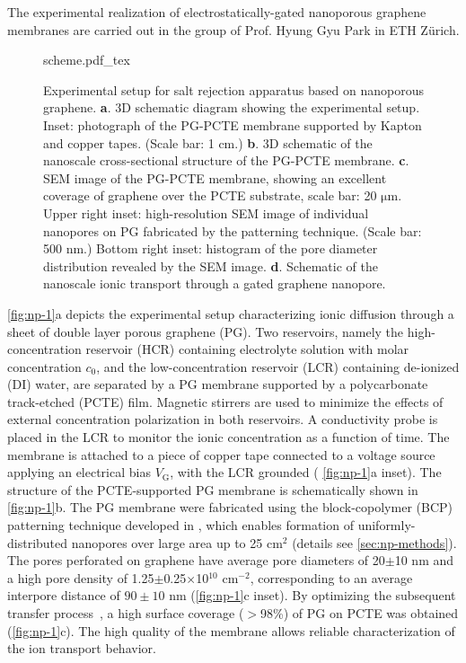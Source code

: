 The experimental realization of electrostatically-gated nanoporous
graphene membranes are carried out in the group of Prof. Hyung Gyu
Park in ETH Zürich.

\begin{figure}[!htbp]
  \centering
  {scheme.pdf_tex}
  \caption{Experimental setup for salt rejection apparatus based on
    nanoporous graphene.  \textbf{a}. 3D schematic diagram showing the
    experimental setup. Inset: photograph of the PG-PCTE membrane
    supported by Kapton and copper tapes. (Scale bar: 1 cm.)
    \textbf{b}. 3D schematic of the nanoscale cross-sectional
    structure of the PG-PCTE membrane. \textbf{c}. SEM image of the
    PG-PCTE membrane, showing an excellent coverage of graphene over
    the PCTE substrate, scale bar: 20 $\mathrm{\mu}$m.  Upper right
    inset: high-resolution SEM image of individual nanopores on PG
    fabricated by the patterning technique. (Scale bar: 500 nm.)
    Bottom right inset: histogram of the pore diameter distribution
    revealed by the SEM image. \textbf{d}. Schematic of the nanoscale
    ionic transport through a gated graphene nanopore.}
  \label{fig:np-1}
\end{figure}

%
 \autoref{fig:np-1}a depicts the experimental setup characterizing
ionic diffusion through a sheet of double layer porous graphene
(PG).
%
Two reservoirs, namely the high-concentration reservoir (HCR)
containing electrolyte solution with molar concentration $c_0$, and
the low-concentration reservoir (LCR) containing de-ionized (DI)
water, are separated by a PG membrane supported by a polycarbonate
track-etched (PCTE) film.
%
Magnetic stirrers are used to minimize the effects of external
concentration polarization in both reservoirs.
%
A conductivity
probe is placed in the LCR to monitor the ionic concentration as a
function of time. The membrane is attached to a piece of copper tape
connected to a voltage source applying an electrical bias
$V_{\mathrm{G}}$, with the LCR grounded ( \autoref{fig:np-1}a
inset).
%
The structure of the PCTE-supported PG membrane is schematically shown
in \autoref{fig:np-1}b. The PG membrane were fabricated using the
block-copolymer (BCP) patterning technique developed in
\cite{Choi_2018_wafer_scale_gr}, which enables formation of
uniformly-distributed nanopores over large area up to 25 cm$^{2}$
(details see \autoref{sec:np-methods}).
%
The pores perforated on graphene have average pore diameters of
20$\pm$10 nm and a high pore density of 1.25$\pm$0.25$\times$10$^{10}$
cm$^{-2}$, corresponding to an average inter\-pore distance of
$90\pm10$ nm  (\autoref{fig:np-1}c inset).
%
By optimizing the subsequent transfer
process~\cite{Choi_2018_wafer_scale_gr}, a high surface coverage
($>$98\%) of PG on PCTE was obtained (\autoref{fig:np-1}c).
The high quality of the membrane allows
reliable characterization of the ion transport behavior.
%


